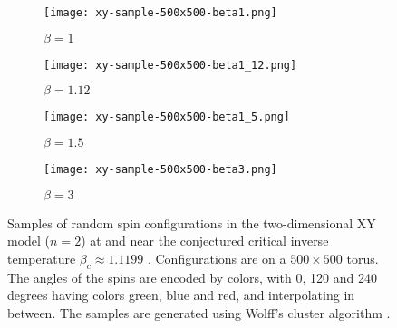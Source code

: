 \documentclass[12pt,reqno]{article}
\begin{document}
\begin{figure}[!ht]
	\centering
	\begin{subfigure}[t]{.49\textwidth}
		\texttt{[image: xy-sample-500x500-beta1.png]}
		\caption{$\beta=1$}
		\label{fig:xy-sample-500x500-beta1}
	\end{subfigure}%
	\begin{subfigure}{10pt}
		\quad
	\end{subfigure}%
	\begin{subfigure}[t]{.49\textwidth}
		\texttt{[image: xy-sample-500x500-beta1\_12.png]}
		\caption{$\beta=1.12$}
		\label{fig:xy-sample-500x500-beta1_12}
	\end{subfigure}
	\medbreak
	\begin{subfigure}[t]{.49\textwidth}
		\texttt{[image: xy-sample-500x500-beta1\_5.png]}
		\caption{$\beta=1.5$}
		\label{fig:xy-sample-500x500-beta1_5}
	\end{subfigure}%
	\begin{subfigure}{10pt}
		\quad
	\end{subfigure}%
	\begin{subfigure}[t]{.49\textwidth}
		\texttt{[image: xy-sample-500x500-beta3.png]}
		\caption{$\beta=3$}
		\label{fig:xy-sample-500x500-beta3}
	\end{subfigure}
	\caption{Samples of random spin configurations in the two-dimensional XY model ($n=2$) at and near the conjectured critical inverse temperature $\beta_c \approx 1.1199$ \cite{hasenbusch2005two, komura2012large}. Configurations are on a $500\times500$ torus. The angles of the spins are encoded by colors, with 0, 120 and 240 degrees having colors green, blue and red, and interpolating in between. The samples are generated using Wolff's cluster algorithm \cite{wolff1989collective}.}
	\label{fig:xy-samples}
\end{figure}
\end{document}
